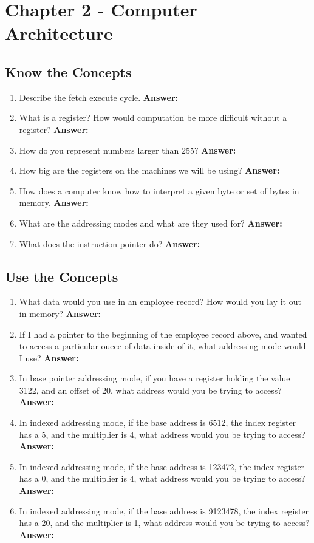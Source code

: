 \documentclass[12pt]{article}
\begin{document}
\section*{Chapter 2 - Computer Architecture}

\subsection*{Know the Concepts}
\begin{enumerate}
    \item Describe the fetch execute cycle.
        \textbf{Answer:}
    \item What is a register? How would computation be more difficult without a register?
        \textbf{Answer:}
    \item How do you represent numbers larger than 255?
        \textbf{Answer:}
    \item How big are the registers on the machines we will be using?
        \textbf{Answer:}
    \item How does a computer know how to interpret a given byte or set of bytes in memory.
        \textbf{Answer:}
    \item What are the addressing modes and what are they used for?
        \textbf{Answer:}
    \item What does the instruction pointer do?
        \textbf{Answer:}
\end{enumerate}

\subsection*{Use the Concepts}
\begin{enumerate}
    \item What data would you use in an employee record? How would you lay it out in memory?
        \textbf{Answer:}
    \item If I had a pointer to the beginning of the employee record above, and wanted to access a particular ouece of data inside of it, what addressing mode would I use?
        \textbf{Answer:}
    \item In base pointer addressing mode, if you have a register holding the value 3122, and an offset of 20, what address would you be trying to access?
        \textbf{Answer:}
    \item In indexed addressing mode, if the base address is 6512, the index register has a 5, and the multiplier is 4, what address would you be trying to access?
        \textbf{Answer:}
    \item In indexed addressing mode, if the base address is 123472, the index register has a 0, and the multiplier is 4, what address would you be trying to access?
        \textbf{Answer:}
    \item In indexed addressing mode, if the base address is 9123478, the index register has a 20, and the multiplier is 1, what address would you be trying to access?
        \textbf{Answer:}
\end{enumerate}
\end{document}

